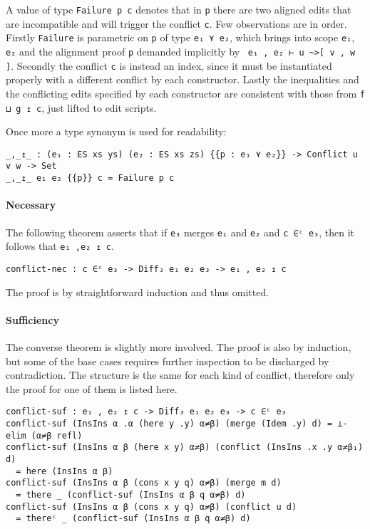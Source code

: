 \documentclass[../Thesis.tex]{subfiles}
\begin{document}
	A value of type \texttt{Failure p c} denotes that in \texttt{p} there are
	two aligned edits that are incompatible and will trigger the conflict 
	\texttt{c}.
	Few observations are in order.
	Firstly \texttt{Failure} is parametric on \texttt{p} of type \texttt{e₁ ⋎ e₂}, 
	which brings into scope \texttt{e₁}, \texttt{e₂} and the alignment proof 
	\texttt{p} demanded 
	implicitly by \texttt{ e₁ , e₂ ⊢ u \textasciitilde>[ v , w ]}.
	Secondly the conflict \texttt{c} is instead an index, since it must be
	instantiated properly with a different conflict by each constructor.
	Lastly the inequalities and the conflicting edits specified by each 
	constructor are consistent with those from \texttt{f ⊔ g ↥ c}, just lifted to
	edit scripts.

	Once more a type synonym is used for readability:
\begin{verbatim}
_,_↥_ : (e₁ : ES xs ys) (e₂ : ES xs zs) {{p : e₁ ⋎ e₂}} -> Conflict u v w -> Set
_,_↥_ e₁ e₂ {{p}} c = Failure p c 
\end{verbatim}
	
	\paragraph{Necessary}
	\label{par:ConflictNec}
	The following theorem asserts that if \texttt{e₃} merges \texttt{e₁} and
	\texttt{e₂} and \texttt{c ∈ᶜ e₃}, then it follows that \texttt{e₁ ,e₂ ↥ c}.
	
\begin{verbatim}
conflict-nec : c ∈ᶜ e₃ -> Diff₃ e₁ e₂ e₃ -> e₁ , e₂ ↥ c
\end{verbatim}

	The proof is by straightforward induction and thus omitted.

	\paragraph{Sufficiency}
	The converse theorem is slightly more involved.
	The proof is also by induction, but some of the base cases requires further 
	inspection to be discharged by contradiction.
	The structure is the same for each kind of conflict, therefore only the
	proof for one of them is listed here.
	
\begin{verbatim}
conflict-suf : e₁ , e₂ ↥ c -> Diff₃ e₁ e₂ e₃ -> c ∈ᶜ e₃
conflict-suf (InsIns α .α (here y .y) α≠β) (merge (Idem .y) d) = ⊥-elim (α≠β refl)
conflict-suf (InsIns α β (here x y) α≠β) (conflict (InsIns .x .y α≠β₁) d) 
  = here (InsIns α β)
conflict-suf (InsIns α β (cons x y q) α≠β) (merge m d) 
  = there _ (conflict-suf (InsIns α β q α≠β) d)
conflict-suf (InsIns α β (cons x y q) α≠β) (conflict u d) 
  = thereᶜ _ (conflict-suf (InsIns α β q α≠β) d)
\end{verbatim}
\end{document}
